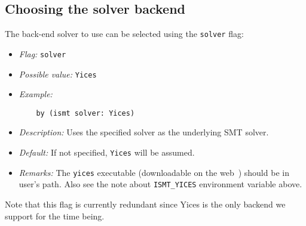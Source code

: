\documentclass{article}
\begin{document}
\subsection{Choosing the solver backend}
The back-end solver to use can be selected using the {\tt solver} flag:
\begin{itemize}
\item {\em Flag:} {\tt solver}
\item {\em Possible value:} {\tt Yices}
\item {\em Example:} 
\begin{verbatim}
    by (ismt solver: Yices)
\end{verbatim}
\item {\em Description:} Uses the specified solver as the underlying SMT solver. 
\item {\em Default:} If not specified, {\tt Yices} will be assumed.
\item {\em Remarks:} The {\tt yices} executable (downloadable on the web~\cite{YicesWWW}) should
be in user's path. Also see the note about {\tt ISMT\_YICES} environment variable above.
\end{itemize}
Note that this flag is currently redundant since Yices is the only backend 
we support for the time being.
\end{document}

